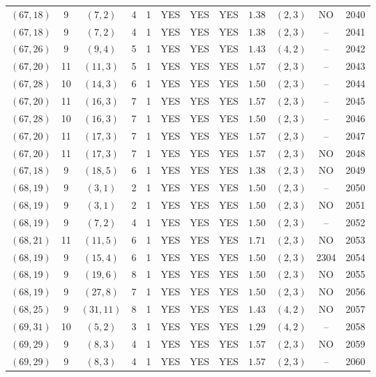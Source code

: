 \begin{longtable}{|c|c|c|c|c|c|c|c|c|c|c|c|}
$(67,18)$ & 9 & $(7,2)$ & 4 & 1 & YES & YES & YES & $1.38$ & $(2,3)$ & NO & 2040\\
$(67,18)$ & 9 & $(7,2)$ & 4 & 1 & YES & YES & YES & $1.38$ & $(2,3)$ & -- & 2041\\
$(67,26)$ & 9 & $(9,4)$ & 5 & 1 & YES & YES & YES & $1.43$ & $(4,2)$ & -- & 2042\\
$(67,20)$ & 11 & $(11,3)$ & 5 & 1 & YES & YES & YES & $1.57$ & $(2,3)$ & -- & 2043\\
$(67,28)$ & 10 & $(14,3)$ & 6 & 1 & YES & YES & YES & $1.50$ & $(2,3)$ & -- & 2044\\
$(67,20)$ & 11 & $(16,3)$ & 7 & 1 & YES & YES & YES & $1.57$ & $(2,3)$ & -- & 2045\\
$(67,28)$ & 10 & $(16,3)$ & 7 & 1 & YES & YES & YES & $1.50$ & $(2,3)$ & -- & 2046\\
$(67,20)$ & 11 & $(17,3)$ & 7 & 1 & YES & YES & YES & $1.57$ & $(2,3)$ & -- & 2047\\
$(67,20)$ & 11 & $(17,3)$ & 7 & 1 & YES & YES & YES & $1.57$ & $(2,3)$ & NO & 2048\\
$(67,18)$ & 9 & $(18,5)$ & 6 & 1 & YES & YES & YES & $1.38$ & $(2,3)$ & NO & 2049\\
$(68,19)$ & 9 & $(3,1)$ & 2 & 1 & YES & YES & YES & $1.50$ & $(2,3)$ & -- & 2050\\
$(68,19)$ & 9 & $(3,1)$ & 2 & 1 & YES & YES & YES & $1.50$ & $(2,3)$ & NO & 2051\\
$(68,19)$ & 9 & $(7,2)$ & 4 & 1 & YES & YES & YES & $1.50$ & $(2,3)$ & -- & 2052\\
$(68,21)$ & 11 & $(11,5)$ & 6 & 1 & YES & YES & YES & $1.71$ & $(2,3)$ & NO & 2053\\
$(68,19)$ & 9 & $(15,4)$ & 6 & 1 & YES & YES & YES & $1.50$ & $(2,3)$ & 2304 & 2054\\
$(68,19)$ & 9 & $(19,6)$ & 8 & 1 & YES & YES & YES & $1.50$ & $(2,3)$ & NO & 2055\\
$(68,19)$ & 9 & $(27,8)$ & 7 & 1 & YES & YES & YES & $1.50$ & $(2,3)$ & NO & 2056\\
$(68,25)$ & 9 & $(31,11)$ & 8 & 1 & YES & YES & YES & $1.43$ & $(4,2)$ & NO & 2057\\
$(69,31)$ & 10 & $(5,2)$ & 3 & 1 & YES & YES & YES & $1.29$ & $(4,2)$ & -- & 2058\\
$(69,29)$ & 9 & $(8,3)$ & 4 & 1 & YES & YES & YES & $1.57$ & $(2,3)$ & NO & 2059\\
$(69,29)$ & 9 & $(8,3)$ & 4 & 1 & YES & YES & YES & $1.57$ & $(2,3)$ & -- & 2060\\

\end{longtable}
